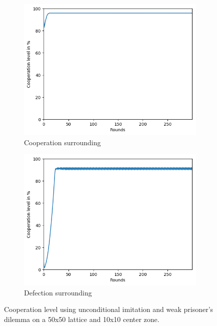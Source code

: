 \documentclass[letterpaper]{article}
\begin{document}
\begin{figure}[H]
    \begin{subfigure}{.5\textwidth}
        \centering
        \includegraphics[width=1\linewidth]{images/assign2/part31-coop/coop.png}
        \caption{Cooperation surrounding}
        \label{fig:part31-coop}
    \end{subfigure}
    \begin{subfigure}{.5\textwidth}
        \centering
        \includegraphics[width=1\linewidth]
        {images/assign2/part31-defect/coop.png}
        \caption{Defection surrounding}
        \label{fig:part31-defect}
    \end{subfigure}
    \caption{Cooperation level using unconditional imitation and
    weak prisoner's dilemma on a 50x50 lattice and 10x10 center zone.}
    \label{fig:50part1}
\end{figure}
\end{document}
